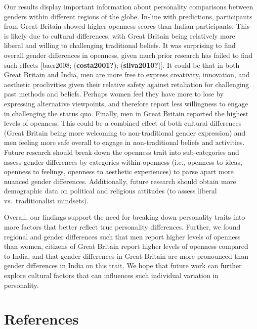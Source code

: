 \documentclass[
  english,
  man, fleqn, noextraspace]{apa6}
\begin{document}
Our results display important information about personality comparisons between genders within different regions of the globe. In-line with predictions, participants from Great Britain showed higher openness scores than Indian participants. This is likely due to cultural differences, with Great Britain being relatively more liberal and willing to challenging traditional beliefs. It was surprising to find overall gender differences in openness, given much prior research has failed to find such effects {[}baer2008; (\textbf{costa2001?}); (\textbf{silva2010?}){]}. It could be that in both Great Britain and India, men are more free to express creativity, innovation, and aesthetic proclivities given their relative safety against retaliation for challenging past methods and beliefs. Perhaps women feel they have more to lose by expressing alternative viewpoints, and therefore report less willingness to engage in challenging the status quo. Finally, men in Great Britain reported the highest levels of openness. This could be a combined effect of both cultural differences (Great Britain being more welcoming to non-traditional gender expression) and men feeling more safe overall to engage in non-traditional beliefs and activities. Future research should break down the openness trait into sub-categories and assess gender differences by categories within openness (i.e., openness to ideas, openness to feelings, openness to aesthetic experiences) to parse apart more nuanced gender differences. Additionally, future research should obtain more demographic data on political and religious attitudes (to assess liberal vs.~traditionalist mindsets).

Overall, our findings support the need for breaking down personality traits into more factors that better reflect true personality differences. Further, we found regional and gender differences such that men report higher levels of openness than women, citizens of Great Britain report higher levels of openness compared to India, and that gender differences in Great Britain are more pronounced than gender differences in India on this trait. We hope that future work can further explore cultural factors that can influences such individual variation in personality.

\newpage

\hypertarget{references}{%
\section{References}\label{references}}
\end{document}
